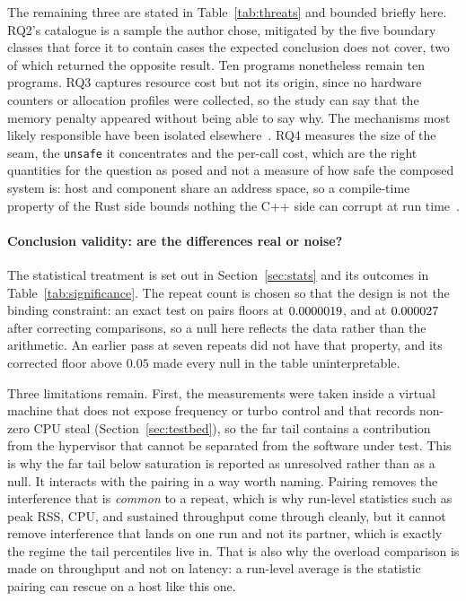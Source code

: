 \documentclass[english,twoside,openright,a4paper,censored,csm,software-track-2020]{HYthesisML}
\begin{document}
The remaining three are stated in Table~\ref{tab:threats} and bounded briefly here. RQ2's
catalogue is a sample the author chose, mitigated by the five boundary classes that force it to
contain cases the expected conclusion does not cover, two of which returned the opposite result.
Ten programs nonetheless remain ten programs. RQ3 captures resource cost but not its origin,
since no hardware counters or allocation profiles were collected, so the study can say that the
memory penalty appeared without being able to say why. The mechanisms most likely responsible have
been isolated elsewhere~\cite{zhang2022runtime,harris2023morello}. RQ4 measures the size of the
seam, the \texttt{unsafe} it concentrates and the per-call cost, which are the right quantities for
the question as posed and not a measure of how safe the composed system is: host and component
share an address space, so a compile-time property of the Rust side bounds nothing the C++ side
can corrupt at run time~\cite{rivera2021galeed,kirth2022pkrusafe}.

\paragraph{Conclusion validity: are the differences real or noise?}
The statistical treatment is set out in Section~\ref{sec:stats} and its outcomes in
Table~\ref{tab:significance}. The repeat count is chosen so that the design is not the binding
constraint: an exact test on \NRepeats{} pairs floors at $0.0000019$, and at
$0.000027$ after correcting \NTests{} comparisons, so a null here reflects the data rather
than the arithmetic. An earlier pass at seven repeats did not have that property, and its
corrected floor above $0.05$ made every null in the table uninterpretable.

Three limitations remain. First, the measurements were taken inside a virtual machine that does
not expose frequency or turbo control and that records non-zero CPU steal
(Section~\ref{sec:testbed}), so the far tail contains a contribution from the hypervisor that
cannot be separated from the software under test. This is why the far tail below saturation is
reported as unresolved rather than as a null. It interacts with the pairing in a way worth naming.
Pairing removes the interference that is \emph{common} to a repeat, which is why run-level
statistics such as peak RSS, CPU, and sustained throughput come through cleanly, but it cannot
remove interference that lands on one run and not its partner, which is exactly the regime the
tail percentiles live in. That is also why the overload comparison is made on throughput and not
on latency: a run-level average is the statistic pairing can rescue on a host like this one.
\end{document}
